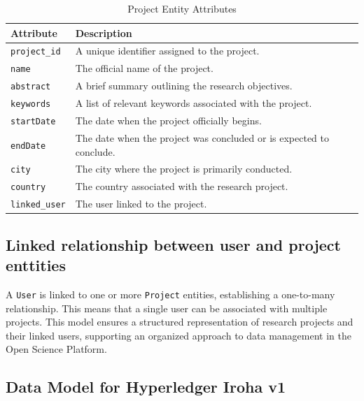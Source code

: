 \documentclass[final]{rc-book-2.14}
\begin{document}
\begin{table}[h]
    \centering
    \renewcommand{\arraystretch}{1.2}
    \caption{Project Entity Attributes}
    \label{tab:project_entity}
    \begin{tabularx}{\textwidth}{|l|X|}
        \hline
        \textbf{Attribute}    & \textbf{Description}                                                \\ \hline
        \texttt{project\_id}  & A unique identifier assigned to the project.                        \\ \hline
        \texttt{name}         & The official name of the project.                                   \\ \hline
        \texttt{abstract}     & A brief summary outlining the research objectives.                  \\ \hline
        \texttt{keywords}     & A list of relevant keywords associated with the project.            \\ \hline
        \texttt{startDate}    & The date when the project officially begins.                        \\ \hline
        \texttt{endDate}      & The date when the project was concluded or is expected to conclude. \\ \hline
        \texttt{city}         & The city where the project is primarily conducted.                  \\ \hline
        \texttt{country}      & The country associated with the research project.                   \\ \hline
        \texttt{linked\_user} & The user linked to the project.                                     \\ \hline
    \end{tabularx}
\end{table}


\subsection{Linked relationship between user and project enttities}
A \texttt{User} is linked to one or more \texttt{Project} entities, establishing a one-to-many relationship. This means that a single user can be associated with multiple projects. This model ensures a structured representation of research projects and their linked users, supporting an organized approach to data management in the Open Science Platform.

\subsection{ Data Model for Hyperledger Iroha v1}
\end{document}
